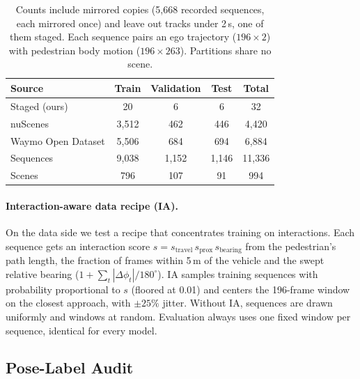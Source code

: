 \documentclass[letterpaper, 10 pt, conference]{ieeeconf}
\begin{document}
\begin{table}[t]
  \centering
  \caption{Counts include mirrored copies (5{,}668 recorded sequences, each mirrored once) and leave out tracks under 2\,s, one of them staged. Each sequence pairs an ego trajectory ($196\times2$) with pedestrian body motion ($196\times263$). Partitions share no scene.}
  \label{tab:dataset}
  \vspace{4pt}
  \small
  \setlength{\tabcolsep}{6pt}
  \begin{tabular}{lcccc}
    \toprule
    Source & Train & Validation & Test & Total \\
    \midrule
    Staged (ours) & 20 & 6 & 6 & 32 \\
    nuScenes & 3{,}512 & 462 & 446 & 4{,}420 \\
    Waymo Open Dataset & 5{,}506 & 684 & 694 & 6{,}884 \\
    \midrule
    Sequences & 9{,}038 & 1{,}152 & 1{,}146 & 11{,}336 \\
    Scenes & 796 & 107 & 91 & 994 \\
    \bottomrule
  \end{tabular}
\end{table}

\paragraph{Interaction-aware data recipe (IA).}
On the data side we test a recipe that concentrates training on interactions. Each sequence gets an interaction score $s = s_{\text{travel}}\, s_{\text{prox}}\, s_{\text{bearing}}$ from the pedestrian's path length, the fraction of frames within 5\,m of the vehicle and the swept relative bearing ($1 + \sum_t|\Delta\phi_t|/180^\circ$). IA samples training sequences with probability proportional to $s$ (floored at 0.01) and centers the 196-frame window on the closest approach, with $\pm25\%$ jitter. Without IA, sequences are drawn uniformly and windows at random. Evaluation always uses one fixed window per sequence, identical for every model.

\subsection{Pose-Label Audit}
\label{sec:posequality}
\end{document}
